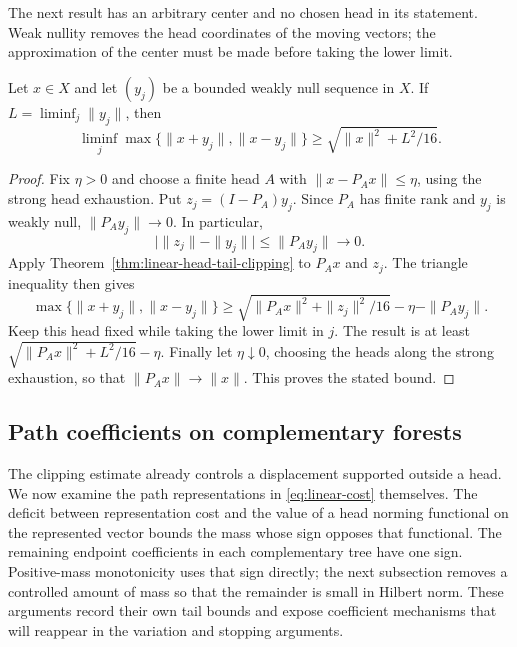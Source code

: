The next result has an arbitrary center and no chosen head in its
statement.  Weak nullity removes the head coordinates of the moving
vectors; the approximation of the center must be made before taking
the lower limit.

\begin{theorem}
\label{thm:linear-weak-sequence}
Let $x\in X$ and let $(y_j)$ be a bounded weakly null sequence in $X$.
If $L=\liminf_j\|y_j\|$, then
\[
 \liminf_j\max\{\|x+y_j\|,\|x-y_j\|\}
 \ge\sqrt{\|x\|^2+L^2/16}.
\]
\end{theorem}

\begin{proof}
Fix $\eta>0$ and choose a finite head $A$ with
$\|x-P_Ax\|\le\eta$, using the strong head exhaustion. Put
$z_j=(I-P_A)y_j$. Since $P_A$ has finite rank and $y_j$ is weakly null,
$\|P_Ay_j\|\to0$. In particular,
\[
 \bigl|\|z_j\|-\|y_j\|\bigr|\le\|P_Ay_j\|\longrightarrow0.
\]
Apply Theorem~\ref{thm:linear-head-tail-clipping} to $P_Ax$ and $z_j$.
The triangle inequality then gives
\[
 \max\{\|x+y_j\|,\|x-y_j\|\}
 \ge\sqrt{\|P_Ax\|^2+\|z_j\|^2/16}
       -\eta-\|P_Ay_j\|.
\]
Keep this head fixed while taking the lower limit in $j$. The result is
at least $\sqrt{\|P_Ax\|^2+L^2/16}-\eta$. Finally let
$\eta\downarrow0$, choosing the heads along the strong exhaustion, so
that $\|P_Ax\|\to\|x\|$. This proves the stated bound.
\end{proof}

\subsection{Path coefficients on complementary forests}
\label{sec:linear-positive-mass}

The clipping estimate already controls a displacement supported outside
a head. We now examine the path representations in
\eqref{eq:linear-cost} themselves. The deficit between representation
cost and the value of a head norming functional on the represented vector
bounds the mass whose sign opposes that
functional. The remaining endpoint coefficients in each complementary
tree have one sign. Positive-mass monotonicity
uses that sign directly; the next subsection removes a controlled amount
of mass so that the remainder is small in Hilbert norm. These arguments
record their own tail bounds and expose coefficient mechanisms that will
reappear in the variation and stopping arguments.

